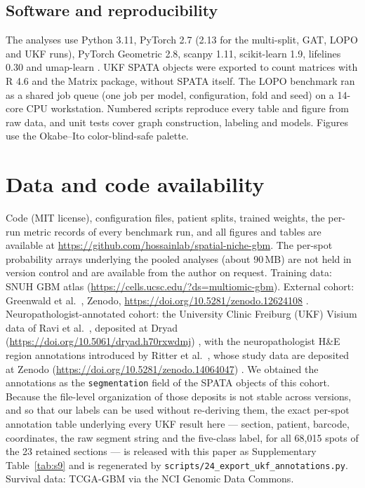 \documentclass[11pt,letterpaper]{article}
\begin{document}
\subsection{Software and reproducibility}

The analyses use Python 3.11, PyTorch 2.7 (2.13 for the multi-split, GAT, LOPO and UKF runs), PyTorch Geometric 2.8, scanpy 1.11, scikit-learn 1.9, lifelines 0.30 and umap-learn \cite{mcinnes2018}. UKF SPATA objects were exported to count matrices with R 4.6 and the Matrix package, without SPATA itself. The LOPO benchmark ran as a shared job queue (one job per model, configuration, fold and seed) on a 14-core CPU workstation. Numbered scripts reproduce every table and figure from raw data, and unit tests cover graph construction, labeling and models. Figures use the Okabe--Ito color-blind-safe palette.

\section*{Data and code availability}
Code (MIT license), configuration files, patient splits, trained weights, the per-run metric records of every benchmark run, and all figures and tables are available at \url{https://github.com/hossainlab/spatial-niche-gbm}. The per-spot probability arrays underlying the pooled analyses (about 90\,MB) are not held in version control and are available from the author on request. Training data: SNUH GBM atlas \cite{park2026} (\url{https://cells.ucsc.edu/?ds=multiomic-gbm}). External cohort: Greenwald et al.\ \cite{greenwald2024}, Zenodo, \url{https://doi.org/10.5281/zenodo.12624108} \cite{greenwald2024data}. Neuropathologist-annotated cohort: the University Clinic Freiburg (UKF) Visium data of Ravi et al.\ \cite{ravi2022}, deposited at Dryad (\url{https://doi.org/10.5061/dryad.h70rxwdmj}) \cite{ravi2022data}, with the neuropathologist H\&E region annotations introduced by Ritter et al.\ \cite{ritter2025}, whose study data are deposited at Zenodo (\url{https://doi.org/10.5281/zenodo.14064047}) \cite{heiland2024data}. We obtained the annotations as the \texttt{segmentation} field of the SPATA objects of this cohort. Because the file-level organization of those deposits is not stable across versions, and so that our labels can be used without re-deriving them, the exact per-spot annotation table underlying every UKF result here --- section, patient, barcode, coordinates, the raw segment string and the five-class label, for all 68{,}015 spots of the 23 retained sections --- is released with this paper as Supplementary Table~\ref{tab:s9} and is regenerated by \texttt{scripts/24\_export\_ukf\_annotations.py}. Survival data: TCGA-GBM via the NCI Genomic Data Commons.
\end{document}
